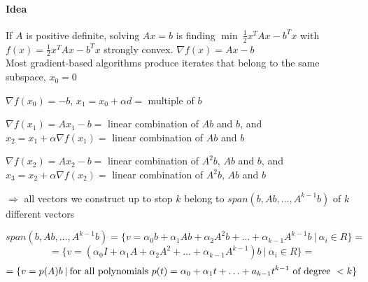 \documentclass[10pt]{report}
\begin{document}
\paragraph{Idea} If $A$ is positive definite, solving $Ax=b$ is finding $\min\:\frac{1}{2}x^TAx - b^Tx$ with $f(x) = \frac{1}{2}x^TAx - b^Tx$ strongly convex. $\nabla f(x) = Ax-b$\\Most gradient-based algorithms produce iterates that belong to the same subspace, $x_0 = 0$\begin{list}{}{}
	\item $\nabla f(x_0) = -b$, $x_1 = x_0+\alpha d=$ multiple of $b$
	\item $\nabla f(x_1) = Ax_1-b=$ linear combination of $Ab$ and $b$, and $x_2=x_1+\alpha\nabla f(x_1) =$ linear combination of $Ab$ and $b$
	\item $\nabla f(x_2) = Ax_2-b=$ linear combination of $A^2b$, $Ab$ and $b$, and $x_3=x_2+\alpha\nabla f(x_2) =$ linear combination of $A^2b$, $Ab$ and $b$
	\item[$\Rightarrow$] all vectors we construct up to stop $k$ belong to $span(b,Ab,\ldots,A^{k-1}b)$ of $k$ different vectors
\end{list}
$$span(b,Ab,\ldots,A^{k-1}b) = \{v=\alpha_0b+\alpha_1Ab+\alpha_2A^2b+\ldots+\alpha_{k-1}A^{k-1}b\:|\:\alpha_i\in R\}=$$
$$=\{v = (\alpha_0I+\alpha_1A+\alpha_2A^2+\ldots+\alpha_{k-1}A^{k-1})b\:|\:\alpha_i\in R\} = $$
$$ = \{v=p(A)b\:|\:\hbox{for all polynomials }p(t)=\alpha_0+\alpha_1t+\ldots+a_{k-1}t^{k-1}\hbox{ of degree }<k\}$$
\end{document}
